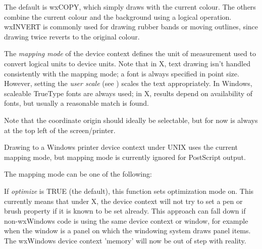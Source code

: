 The default is wxCOPY, which simply draws with the current colour.
The others combine the current colour and the background using a
logical operation.  wxINVERT is commonly used for drawing rubber bands or
moving outlines, since drawing twice reverts to the original colour.

\label{wxdcsetmapmode}


The {\it mapping mode} of the device context defines the unit of
measurement used to convert logical units to device units. Note that
in X, text drawing isn't handled consistently with the mapping mode; a
font is always specified in point size. However, setting the {\it
user scale} (see ) scales the text appropriately. In
Windows, scaleable TrueType fonts are always used; in X, results depend
on availability of fonts, but usually a reasonable match is found.

Note that the coordinate origin should ideally be selectable, but for
now is always at the top left of the screen/printer.

Drawing to a Windows printer device context under UNIX
uses the current mapping mode, but mapping mode is currently ignored for
PostScript output.

The mapping mode can be one of the following:

\begin{twocollist}\itemsep=0pt
\end{twocollist}

\label{wxsetoptimization}


If {\it optimize} is TRUE (the default), this function sets optimization mode on.
This currently means that under X, the device context will not try to set a pen or brush
property if it is known to be set already. This approach can fall down
if non-wxWindows code is using the same device context or window, for example
when the window is a panel on which the windowing system draws panel items.
The wxWindows device context 'memory' will now be out of step with reality.

